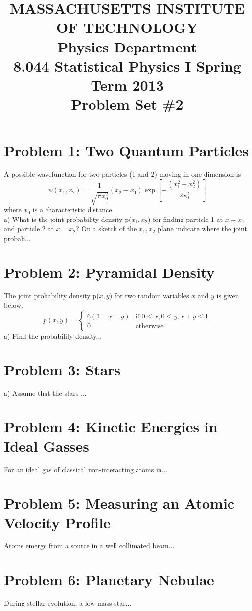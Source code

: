 \documentclass{article}
\begin{document}
\title{MASSACHUSETTS INSTITUTE OF TECHNOLOGY \\
  Physics Department \\
  8.044 Statistical Physics I Spring Term 2013 \\
  Problem Set \#2}

\maketitle

\section*{Problem 1: Two Quantum Particles}
A possible wavefunction for two particles (1 and 2) moving in one dimension is 
\[
\psi(x_1,x_2) = \frac{1}{\sqrt{\pi x_0^2}} (x_2 - x_1) \exp\left[ -\frac{(x_1^2 + x_2^2)}{2x_0^2} \right]
\]
where $x_0$ is a characteristic distance. \\
a) What is the joint probability density p($x_1, x_2$) for finding particle 1 at $x = x_1$ and particle 2 at $x = x_2$? On a sketch of the $x_1, x_2$ plane indicate where the joint probab...

\section*{Problem 2: Pyramidal Density}
The joint probability density p($x, y$) for two random variables $x$ and $y$ is given below.
\[
p(x, y) =
\begin{cases} 
      6(1 - x - y) & \text{if } 0 \leq x, 0 \leq y, x + y \leq 1 \\
      0 & \text{otherwise }
   \end{cases}
\]
a) Find the probability density...

\section*{Problem 3: Stars}
a) Assume that the stars ...

\section*{Problem 4: Kinetic Energies in Ideal Gasses}
For an ideal gas of classical non-interacting atoms in...

\section*{Problem 5: Measuring an Atomic Velocity Profile}
Atoms emerge from a source in a well collimated beam...

\section*{Problem 6: Planetary Nebulae}
During stellar evolution, a low mass star...
\end{document}
